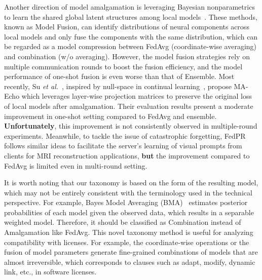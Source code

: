 Another direction of model amalgamation is leveraging Bayesian nonparametrics to learn the shared global latent structures among local models~\cite{yurochkin2019bayesian, yurochkin2019statistical, lam2021model}. 
These methods, known as Model Fusion, can identify distributions of neural components across local models and only fuse the components with the same distribution, which can be regarded as a model compression between FedAvg (coordinate-wise averaging) and combination (w/o averaging).
However, the model fusion strategies rely on multiple communication rounds to boost the fusion efficiency, and the model performance of one-shot fusion is even worse than that of Ensemble.
Most recently, Su \textit{et al.}~\cite{su2023one}, inspired by null-space in continual learning~\cite{wang2021training, kong2022balancing}, propose MA-Echo which leverages layer-wise projection matrices to preserve the original loss of local models after amalgamation.
Their evaluation results present a moderate improvement in one-shot setting compared to FedAvg and ensemble.
\textbf{Unfortunately}, this improvement is not consistently observed in multiple-round experiments.
Meanwhile, to tackle the issue of catastrophic forgetting, FedPR~\cite{feng2023learning} follows similar ideas to facilitate the server's learning of visual prompts from clients for MRI reconstruction applications, \textbf{but} the improvement compared to FedAvg is limited even in multi-round setting.

It is worth noting that our taxonomy is based on the form of the resulting model, which may not be entirely consistent with the terminology used in the technical perspective.
For example, Bayes Model Averaging (BMA)~\cite{clarke2003comparing} estimates posterior probabilities of each model given the observed data, which results in a separable weighted model. 
Therefore, it should be classified as Combination instead of Amalgamation like FedAvg.
This novel taxonomy method is useful for analyzing compatibility with licenses. 
For example, the coordinate-wise operations or the fusion of model parameters generate fine-grained combinations of models that are almost irreversible, which corresponds to clauses such as adapt, modify, dynamic link, etc., in software licenses.

